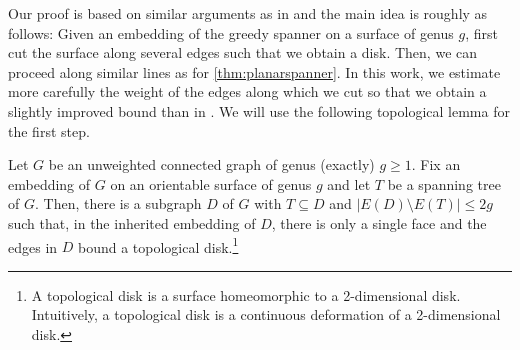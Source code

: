 \documentclass[a4paper,cleveref, autoref, thm-restate, thm-restate, UKenglish]{lipics-v2021}
\renewcommand{\subset}{\subseteq}
\begin{document}
Our proof is based on similar arguments as in  \cite[Theorem 2]{megow} and the main idea is roughly as follows: Given an embedding of the greedy spanner on a surface of genus $g$, first cut the surface along several edges such that we obtain a disk. 
Then, we can proceed along similar lines as for \cref{thm:planarspanner}. In this work, we estimate more carefully the weight of the edges along which we cut so that we obtain a slightly improved bound than in \cite{megow}.
We will use the following topological lemma for the first step.
\begin{lemma}\label{lem:constructionD}
 Let $G$ be an unweighted connected graph of genus (exactly) $g\geq 1$.
Fix an embedding of $G$ on an orientable surface of genus $g$ and let $T$ be a spanning tree of $G$. Then, there is a subgraph $D$ of $G$ with $T \subset D$ and $|E(D) \setminus E(T)|\leq 2g$ such that, in the inherited embedding of $D$, there is only a single face and the edges in $D$ bound a topological disk.\footnote{A topological disk is a surface homeomorphic to a 2-dimensional disk. Intuitively, a topological disk is a continuous deformation of a 2-dimensional disk.}
\end{lemma}
\end{document}
